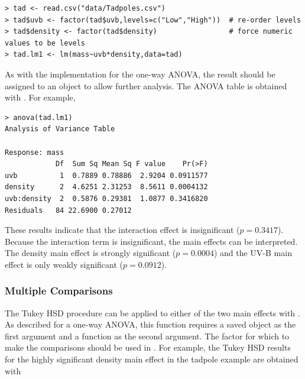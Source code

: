 \documentclass[10pt,openany]{book}\usepackage[]{graphicx}\usepackage[]{color}
\makeatletter
\newenvironment{kframe}{%
 \def\at@end@of@kframe{}%
 \ifinner\ifhmode%
  \def\at@end@of@kframe{\end{minipage}}%
  \begin{minipage}{\columnwidth}%
 \fi\fi%
 \def\FrameCommand##1{\hskip\@totalleftmargin \hskip-\fboxsep
 \colorbox{shadecolor}{##1}\hskip-\fboxsep
     \hskip-\linewidth \hskip-\@totalleftmargin \hskip\columnwidth}%
 \MakeFramed {\advance\hsize-\width
   \@totalleftmargin\z@ \linewidth\hsize
   \@setminipage}}%
 {\par\unskip\endMakeFramed%
 \at@end@of@kframe}
\newenvironment{knitrout}{}{} %
\makeatother
\begin{document}
\begin{knitrout}
\color{fgcolor}\begin{kframe}
\begin{verbatim}
> tad <- read.csv("data/Tadpoles.csv")
> tad$uvb <- factor(tad$uvb,levels=c("Low","High"))  # re-order levels
> tad$density <- factor(tad$density)                 # force numeric values to be levels
> tad.lm1 <- lm(mass~uvb*density,data=tad)
\end{verbatim}
\end{kframe}
\end{knitrout}

As with the  implementation for the one-way ANOVA, the result should be assigned to an object to allow further analysis.  The ANOVA table is obtained with .  For example,

\begin{knitrout}
\color{fgcolor}\begin{kframe}
\begin{verbatim}
> anova(tad.lm1)
Analysis of Variance Table

Response: mass
            Df  Sum Sq Mean Sq F value    Pr(>F)
uvb          1  0.7889 0.78886  2.9204 0.0911577
density      2  4.6251 2.31253  8.5611 0.0004132
uvb:density  2  0.5876 0.29381  1.0877 0.3416820
Residuals   84 22.6900 0.27012                  
\end{verbatim}
\end{kframe}
\end{knitrout}

These results indicate that the interaction effect is insignificant ($p=0.3417$).  Because the interaction term is insignificant, the main effects can be interpreted.  The density main effect is strongly significant ($p=0.0004$) and the UV-B main effect is only weakly significant ($p=0.0912$).

\subsubsection*{Multiple Comparisons}
The Tukey HSD procedure can be applied to either of the two main effects with .  As described for a one-way ANOVA, this function requires a saved  object as the first argument and a  function as the second argument.  The factor for which to make the comparisons should be used in .  For example, the Tukey HSD results for the highly significant density main effect in the tadpole example are obtained with
\end{document}
